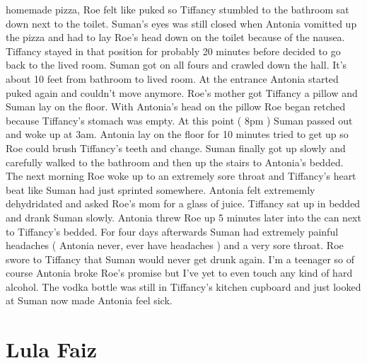 \documentclass[12pt]{book}
\begin{document}
homemade pizza, Roe felt like puked so Tiffancy stumbled to the bathroom sat down next to the toilet. Suman's eyes was still closed when Antonia vomitted up the pizza and had to lay Roe's head down on the toilet because of the nausea. Tiffancy stayed in that position for probably 20 minutes before decided to go back to the lived room. Suman got on all fours and crawled down the hall. It's about 10 feet from bathroom to lived room. At the entrance Antonia started puked again and couldn't move anymore. Roe's mother got Tiffancy a pillow and Suman lay on the floor. With Antonia's head on the pillow Roe began retched because Tiffancy's stomach was empty. At this point ( 8pm ) Suman passed out and woke up at 3am. Antonia lay on the floor for 10 minutes tried to get up so Roe could brush Tiffancy's teeth and change. Suman finally got up slowly and carefully walked to the bathroom and then up the stairs to Antonia's bedded. The next morning Roe woke up to an extremely sore throat and Tiffancy's heart beat like Suman had just sprinted somewhere. Antonia felt extrememly dehydridated and asked Roe's mom for a glass of juice. Tiffancy sat up in bedded and drank Suman slowly. Antonia threw Roe up 5 minutes later into the can next to Tiffancy's bedded. For four days afterwards Suman had extremely painful headaches ( Antonia never, ever have headaches ) and a very sore throat. Roe swore to Tiffancy that Suman would never get drunk again. I'm a teenager so of course Antonia broke Roe's promise but I've yet to even touch any kind of hard alcohol. The vodka bottle was still in Tiffancy's kitchen cupboard and just looked at Suman now made Antonia feel sick.



\chapter{Lula Faiz}
\end{document}
